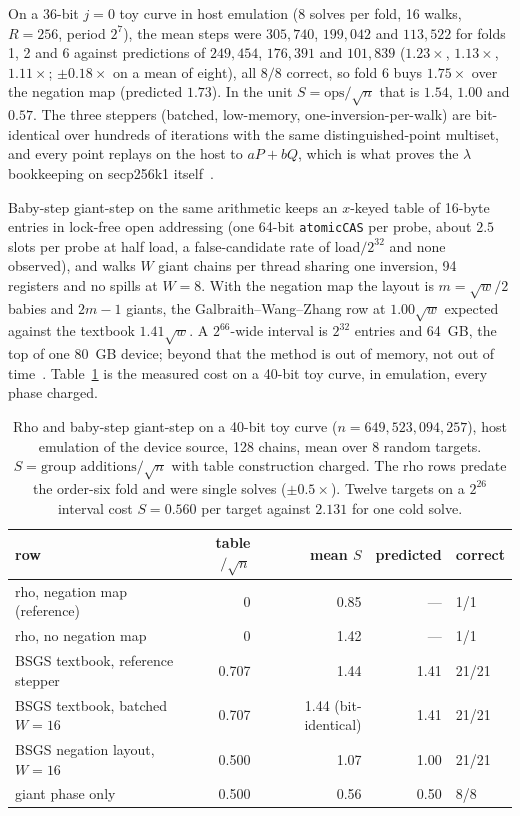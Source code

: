 On a 36-bit $j=0$ toy curve in host emulation (8 solves per fold, 16
walks, $R=256$, period $2^7$), the mean steps were $305{,}740$,
$199{,}042$ and $113{,}522$ for folds 1, 2 and 6 against predictions of
$249{,}454$, $176{,}391$ and $101{,}839$ ($1.23\times$, $1.13\times$,
$1.11\times$; $\pm0.18\times$ on a mean of eight), all $8/8$ correct,
so fold 6 buys $1.75\times$ over the negation map (predicted $1.73$).
In the unit $S=\text{ops}/\sqrt n$ that is $1.54$, $1.00$ and $0.57$.
The three steppers (batched, low-memory, one-inversion-per-walk) are
bit-identical over hundreds of iterations with the same
distinguished-point multiset, and every point replays on the host to
$aP+bQ$, which is what proves the $\lambda$ bookkeeping on secp256k1
itself~.

Baby-step giant-step on the same arithmetic keeps an $x$-keyed table
of 16-byte entries in lock-free open addressing (one 64-bit
\texttt{atomicCAS} per probe, about $2.5$ slots per probe at half
load, a false-candidate rate of load$/2^{32}$ and none observed), and
walks $W$ giant chains per thread sharing one inversion, 94 registers
and no spills at $W=8$. With the negation map the layout is $m=\sqrt{w}/2$
babies and $2m-1$ giants, the Galbraith--Wang--Zhang row at $1.00\sqrt w$
expected against the textbook $1.41\sqrt w$. A $2^{66}$-wide interval
is $2^{32}$ entries and 64~GB, the top of one 80~GB device; beyond
that the method is out of memory, not out of
time~.
Table~\ref{tab:bsgs} is the measured cost on a 40-bit toy curve, in
emulation, every phase charged.

\begin{table}[t]
\centering
\small
\caption{Rho and baby-step giant-step on a 40-bit toy curve
  ($n=649{,}523{,}094{,}257$), host emulation of the device source, 128
  chains, mean over 8 random targets. $S=\text{group additions}/\sqrt n$
  with table construction charged. The rho rows predate the order-six
  fold and were single solves ($\pm0.5\times$). Twelve targets on a
  $2^{26}$ interval cost $S=0.560$ per target against $2.131$ for one
  cold solve.}
\label{tab:bsgs}
\begin{tabular}{@{}lrrrl@{}}
\toprule
row & table$/\sqrt n$ & mean $S$ & predicted & correct \\
\midrule
rho, negation map (reference) & 0 & 0.85 & --- & 1/1 \\
rho, no negation map & 0 & 1.42 & --- & 1/1 \\
BSGS textbook, reference stepper & 0.707 & 1.44 & 1.41 & 21/21 \\
BSGS textbook, batched $W=16$ & 0.707 & 1.44 (bit-identical) & 1.41 & 21/21 \\
BSGS negation layout, $W=16$ & 0.500 & 1.07 & 1.00 & 21/21 \\
\quad giant phase only & 0.500 & 0.56 & 0.50 & 8/8 \\
\bottomrule
\end{tabular}
\end{table}

